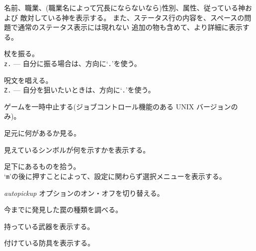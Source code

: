 名前、職業、(職業名によって冗長にならないなら)性別、属性、従っている神および
敵対している神を表示する。
また、ステータス行の内容を、スペースの問題で通常のステータス表示には現れない
追加の物も含めて、より詳細に表示する。
\item[\tb{z}]
杖を振る。\\
{\tt z.} --- 自分に振る場合は、方向に`{\tt .}'を使う。
\item[\tb{Z}]
呪文を唱える。\\
{\tt Z.} --- 自分を狙いたいときは、方向に`{\tt .}'を使う。
\item[\tb{\^{}Z}]
ゲームを一時中止する(ジョブコントロール機能のある UNIX バージョンのみ)。
\item[\tb{:}]
足元に何があるか見る。
\item[\tb{;}]
見えているシンボルが何を示すかを表示する。
\item[\tb{,}]
足下にあるものを拾う。\\
`{\tt m}'の後に押すことによって、設定に関わらず選択メニューを表示する。
\item[\tb{@}]
{\it autopickup\/} オプションのオン・オフを切り替える。
\item[\tb{\^{}}]
今までに発見した罠の種類を調べる。
\item[\tb{)}]
持っている武器を表示する。
\item[\tb{[}]
付けている防具を表示する。
